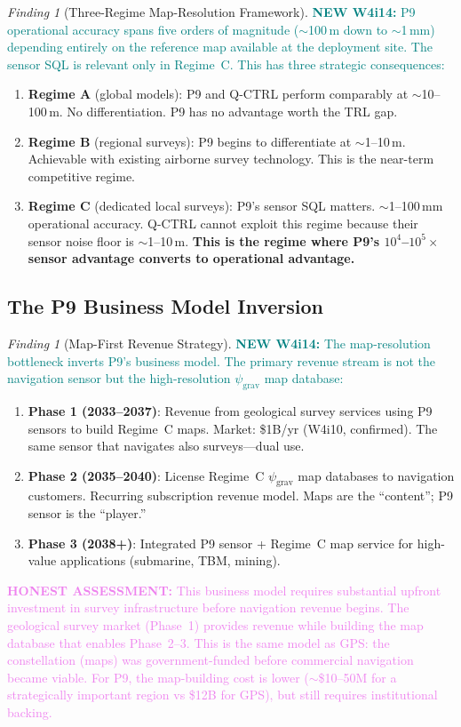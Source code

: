 \documentclass[11pt]{article}
\theoremstyle{definition}
\theoremstyle{remark}
\newtheorem{finding}[theorem]{Finding}
\newcommand{\psigrav}{\psi_{\mathrm{grav}}}
\newcommand{\honest}[1]{\textcolor{violet}{\textbf{HONEST ASSESSMENT:} #1}}
\newcommand{\newfinding}[1]{\textcolor{teal}{\textbf{NEW W4i14:} #1}}
\begin{document}
\begin{finding}[Three-Regime Map-Resolution Framework]
\label{find:three-regime}
\newfinding{P9 operational accuracy spans five orders of magnitude
($\sim$100\,m down to $\sim$1\,mm) depending entirely on the reference
map available at the deployment site. The sensor SQL is relevant only
in Regime~C. This has three strategic consequences:}
\begin{enumerate}[nosep]
\item \textbf{Regime A} (global models): P9 and Q-CTRL perform comparably
  at $\sim$10--100\,m. No differentiation. P9 has no advantage worth
  the TRL gap.
\item \textbf{Regime B} (regional surveys): P9 begins to differentiate
  at $\sim$1--10\,m. Achievable with existing airborne survey technology.
  This is the near-term competitive regime.
\item \textbf{Regime C} (dedicated local surveys): P9's sensor SQL matters.
  $\sim$1--100\,mm operational accuracy. Q-CTRL cannot exploit this regime
  because their sensor noise floor is $\sim$1--10\,m. \textbf{This is the
  regime where P9's $10^4$--$10^5\times$ sensor advantage converts to
  operational advantage.}
\end{enumerate}
\end{finding}

\subsection{The P9 Business Model Inversion}

\begin{finding}[Map-First Revenue Strategy]
\label{find:map-first}
\newfinding{The map-resolution bottleneck inverts P9's business model.
The primary revenue stream is not the navigation sensor but the
high-resolution $\psigrav$ map database:}
\begin{enumerate}[nosep]
\item \textbf{Phase 1 (2033--2037)}: Revenue from geological survey services
  using P9 sensors to build Regime~C maps. Market: \$1B/yr (W4i10,
  confirmed). The same sensor that navigates also surveys---dual use.
\item \textbf{Phase 2 (2035--2040)}: License Regime~C $\psigrav$ map
  databases to navigation customers. Recurring subscription revenue
  model. Maps are the ``content''; P9 sensor is the ``player.''
\item \textbf{Phase 3 (2038+)}: Integrated P9 sensor + Regime~C map
  service for high-value applications (submarine, TBM, mining).
\end{enumerate}

\honest{This business model requires substantial upfront investment in
survey infrastructure before navigation revenue begins. The geological
survey market (Phase~1) provides revenue while building the map database
that enables Phase~2--3. This is the same model as GPS: the constellation
(maps) was government-funded before commercial navigation became viable.
For P9, the map-building cost is lower ($\sim$\$10--50M for a
strategically important region vs \$12B for GPS), but still requires
institutional backing.}
\end{finding}
\end{document}
